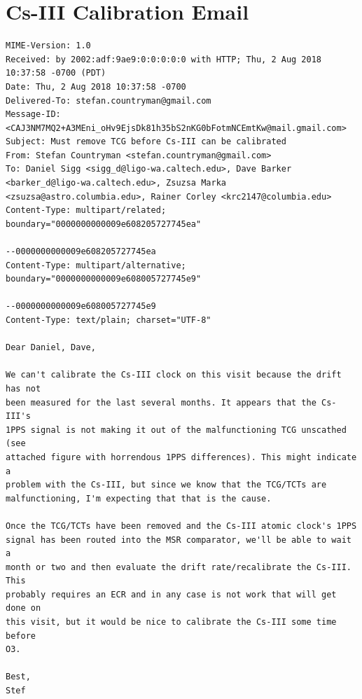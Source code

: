 \documentclass{article}
\begin{document}
\section{Cs-III Calibration Email}
\label{sec:cesiumemail}
\lstset{language=}
\begin{lstlisting}
MIME-Version: 1.0
Received: by 2002:adf:9ae9:0:0:0:0:0 with HTTP; Thu, 2 Aug 2018 10:37:58 -0700 (PDT)
Date: Thu, 2 Aug 2018 10:37:58 -0700
Delivered-To: stefan.countryman@gmail.com
Message-ID: <CAJ3NM7MQ2+A3MEni_oHv9EjsDk81h35bS2nKG0bFotmNCEmtKw@mail.gmail.com>
Subject: Must remove TCG before Cs-III can be calibrated
From: Stefan Countryman <stefan.countryman@gmail.com>
To: Daniel Sigg <sigg_d@ligo-wa.caltech.edu>, Dave Barker <barker_d@ligo-wa.caltech.edu>, Zsuzsa Marka <zsuzsa@astro.columbia.edu>, Rainer Corley <krc2147@columbia.edu>
Content-Type: multipart/related; boundary="0000000000009e608205727745ea"

--0000000000009e608205727745ea
Content-Type: multipart/alternative; boundary="0000000000009e608005727745e9"

--0000000000009e608005727745e9
Content-Type: text/plain; charset="UTF-8"

Dear Daniel, Dave,

We can't calibrate the Cs-III clock on this visit because the drift has not
been measured for the last several months. It appears that the Cs-III's
1PPS signal is not making it out of the malfunctioning TCG unscathed (see
attached figure with horrendous 1PPS differences). This might indicate a
problem with the Cs-III, but since we know that the TCG/TCTs are
malfunctioning, I'm expecting that that is the cause.

Once the TCG/TCTs have been removed and the Cs-III atomic clock's 1PPS
signal has been routed into the MSR comparator, we'll be able to wait a
month or two and then evaluate the drift rate/recalibrate the Cs-III. This
probably requires an ECR and in any case is not work that will get done on
this visit, but it would be nice to calibrate the Cs-III some time before
O3.

Best,
Stef
\end{lstlisting}

\clearpage
\end{document}
